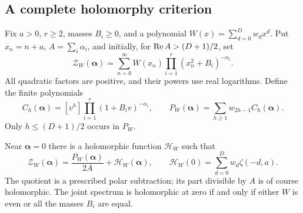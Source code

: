 \subsection{A complete holomorphy criterion}

Fix $a>0$, $r\ge2$, masses $B_i\ge0$, and a polynomial
$W(x)=\sum_{d=0}^Dw_dx^d$.  Put $x_n=n+a$, $A=\sum_i\alpha_i$,
and initially, for $\operatorname{Re} A>(D+1)/2$, set
\begin{equation}\label{sfj:eq:joint}
 \mathscr Z_W(\boldsymbol\alpha)
    =\sum_{n=0}^\infty W(x_n)
                  \prod_{i=1}^r(x_n^2+B_i)^{-\alpha_i}.
\end{equation}
All quadratic factors are positive, and their powers use real
logarithms.  Define the finite polynomials
\begin{equation}\label{sfj:eq:polar-poly}
 C_h(\boldsymbol\alpha)
  =[v^h]\prod_{i=1}^r(1+B_iv)^{-\alpha_i},\qquad
 P_W(\boldsymbol\alpha)=\sum_{h\ge1}w_{2h-1}C_h(\boldsymbol\alpha).
\end{equation}
Only $h\le(D+1)/2$ occurs in $P_W$.

\begin{theorem}
\label{sfj:thm:pole}
Near $\boldsymbol\alpha=0$ there is a holomorphic function
$\mathscr H_W$ such that
\begin{equation}\label{sfj:eq:pole}
 \boxed{\displaystyle
 \mathscr Z_W(\boldsymbol\alpha)
     =\frac{P_W(\boldsymbol\alpha)}{2A}
                         +\mathscr H_W(\boldsymbol\alpha),\qquad
 \mathscr H_W(0)=\sum_{d=0}^D w_d\zeta(-d,a).}
\end{equation}
The quotient is a prescribed polar subtraction; its part divisible
by $A$ is of course holomorphic.  The joint spectrum is holomorphic
at zero if and only if either $W$ is even or all the masses $B_i$
are equal.
\end{theorem}

